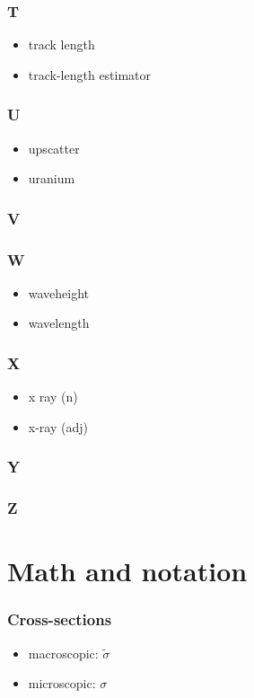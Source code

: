 \documentclass[10pt, letter]{article}
\begin{document}
\begin{multicols}{2}
\subsubsection*{T}
\begin{itemize}
\item track length
\item track-length estimator
\end{itemize}
\subsubsection*{U}
\begin{itemize}
\item upscatter
\item uranium
\end{itemize}
\subsubsection*{V}
\subsubsection*{W}
\begin{itemize}
\item waveheight
\item wavelength
\end{itemize}

\subsubsection*{X}
\begin{itemize}
\item x ray (n) 
\item x-ray (adj)
\end{itemize}
\subsubsection*{Y}
\subsubsection*{Z}

\pagebreak

\section{Math and notation}\label{sec:math}

\subsubsection*{Cross-sections}
\begin{itemize}
\item macroscopic: $\tilde{\sigma}$
\item microscopic: $\sigma$
\end{itemize}


\end{multicols}
\end{document}
